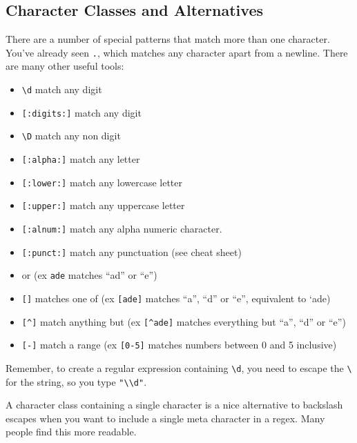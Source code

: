 \documentclass[]{book}
\providecommand{\tightlist}{%
  \setlength{\itemsep}{0pt}\setlength{\parskip}{0pt}}
\let\BeginKnitrBlock\begin \let\EndKnitrBlock\end
\begin{document}
\subsection{Character Classes and
Alternatives}\label{character-classes-and-alternatives}

There are a number of special patterns that match more than one
character. You've already seen \texttt{.}, which matches any character
apart from a newline. There are many other useful tools:

\begin{itemize}
\tightlist
\item
  \texttt{\textbackslash{}d} match any digit
\item
  \texttt{{[}:digits:{]}} match any digit
\item
  \texttt{\textbackslash{}D} match any non digit
\item
  \texttt{{[}:alpha:{]}} match any letter
\item
  \texttt{{[}:lower:{]}} match any lowercase letter
\item
  \texttt{{[}:upper:{]}} match any uppercase letter
\item
  \texttt{{[}:alnum:{]}} match any alpha numeric character.
\item
  \texttt{{[}:punct:{]}} match any punctuation (see cheat sheet)
\item
  \texttt{\textbar{}} or (ex \texttt{ad\textbar{}e} matches ``ad'' or
  ``e'')
\item
  \texttt{{[}{]}} matches one of (ex \texttt{{[}ade{]}} matches ``a'',
  ``d'' or ``e'', equivalent to `a\textbar{}d\textbar{}e)
\item
  \texttt{{[}\^{}{]}} match anything but (ex \texttt{{[}\^{}ade{]}}
  matches everything but ``a'', ``d'' or ``e'')
\item
  \texttt{{[}-{]}} match a range (ex \texttt{{[}0-5{]}} matches numbers
  between 0 and 5 inclusive)
\end{itemize}

\BeginKnitrBlock{rmdimportant}
Remember, to create a regular expression containing
\texttt{\textbackslash{}d}, you need to escape the
\texttt{\textbackslash{}} for the string, so you type
\texttt{"\textbackslash{}\textbackslash{}d"}.
\EndKnitrBlock{rmdimportant}

A character class containing a single character is a nice alternative to
backslash escapes when you want to include a single meta character in a
regex. Many people find this more readable.
\end{document}
